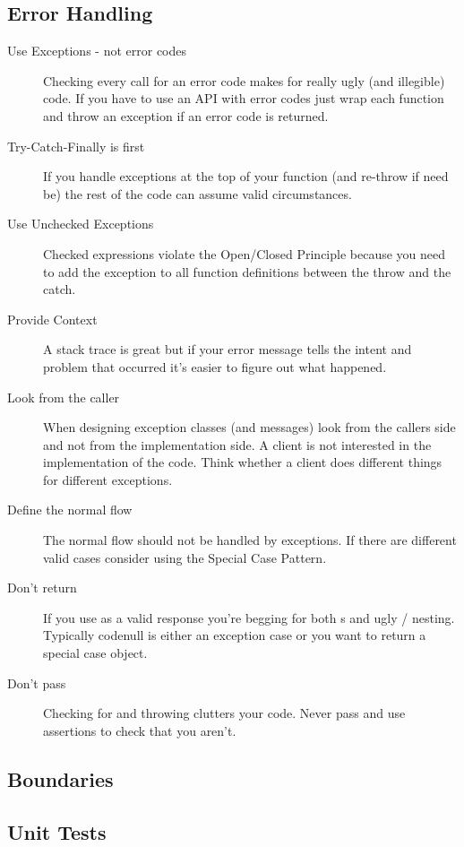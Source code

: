 \documentclass[a4paper, twocolumn]{article}
\newcommand{\code}[1]{\texttt{\color{black}{#1}}}
\begin{document}
\subsection{Error Handling}
\begin{description}
	\item[Use Exceptions - not error codes] Checking every call for an error code makes for really ugly (and illegible) code. If you have to use an API with error codes just wrap each function and throw an exception if an error code is returned.
	\item[Try-Catch-Finally is first] If you handle exceptions at the top of your function (and re-throw if need be) the rest of the code can assume valid circumstances.
	\item[Use Unchecked Exceptions] Checked expressions violate the Open/Closed Principle because you need to add the exception to all function definitions between the throw and the catch.
	\item[Provide Context] A stack trace is great but if your error message tells the intent and problem that occurred it's easier to figure out what happened.
	\item[Look from the caller] When designing exception classes (and messages) look from the callers side and not from the implementation side. A client is not interested in the implementation of the code. Think whether a client does different things for different exceptions.
	\item[Define the normal flow] The normal flow should not be handled by exceptions. If there are different valid cases consider using the Special Case Pattern.
	\item[Don't return \code{null}] If you use \code{null} as a valid response you're begging for both \code{NullPointerException}s and ugly \code{if}/\code{else} nesting. Typically code{null} is either an exception case or you want to return a special case object.
	\item[Don't pass \code{null}] Checking for \code{null} and throwing \code{InvalidArgumentExceptions} clutters your code. Never pass \code{null} and use assertions to check that you aren't.
\end{description}

\subsection{Boundaries}

\subsection{Unit Tests}
\end{document}
